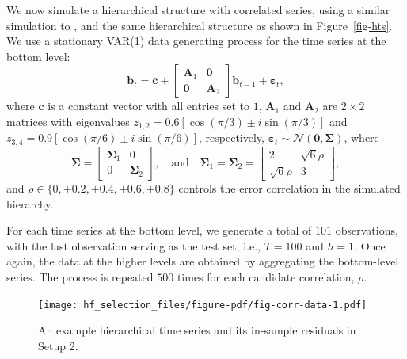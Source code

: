 \documentclass[
  11pt]{article}
\begin{document}
We now simulate a hierarchical structure with correlated series, using a
similar simulation to \citet{Wickramasuriya2021-am}, and the same
hierarchical structure as shown in Figure~\ref{fig-hts}. We use a
stationary VAR(1) data generating process for the time series at the
bottom level: \[
\bm{b}_t= \bm{c} + \left[\begin{array}{cc}
\bm{A}_1 & \bm{0} \\
\bm{0} & \bm{A}_2
\end{array}\right] \bm{b}_{t-1} + \bm{\varepsilon}_t,
\] where \(\bm{c}\) is a constant vector with all entries set to \(1\),
\(\bm{A}_1\) and \(\bm{A}_2\) are \(2 \times 2\) matrices with
eigenvalues \(z_{1,2}=0.6[\cos (\pi / 3) \pm i \sin (\pi / 3)]\) and
\(z_{3,4}=0.9[\cos (\pi / 6) \pm i \sin (\pi / 6)]\), respectively,
\(\bm{\varepsilon}_t \sim \mathcal{N}(\bm{0}, \bm{\Sigma})\), where \[
\bm{\Sigma}=\left[\begin{array}{cc}
\bm{\Sigma}_1 & 0 \\0 & \bm{\Sigma}_2
\end{array}\right], \quad\text{and}\quad \bm{\Sigma}_1=\bm{\Sigma}_2=\left[\begin{array}{cc}2 & \sqrt{6} \rho \\\sqrt{6} \rho & 3\end{array}\right],
\] and \(\rho \in \{0, \pm 0.2, \pm 0.4, \pm 0.6, \pm 0.8\}\) controls
the error correlation in the simulated hierarchy.

For each time series at the bottom level, we generate a total of \(101\)
observations, with the last observation serving as the test set, i.e.,
\(T=100\) and \(h=1\). Once again, the data at the higher levels are
obtained by aggregating the bottom-level series. The process is repeated
\(500\) times for each candidate correlation, \(\rho\).

\begin{figure}[!b]

{\centering \texttt{[image: hf\_selection\_files/figure-pdf/fig-corr-data-1.pdf]}

}

\caption{\label{fig-corr-data}An example hierarchical time series and
its in-sample residuals in Setup 2.}

\end{figure}
\end{document}

